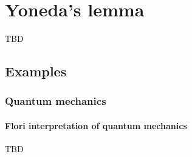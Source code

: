 \chapter{Yoneda's lemma}
\label{sec:yoneda}

TBD

\section{Examples}

\subsection{Quantum mechanics}

\subsubsection{Flori interpretation of quantum mechanics}
TBD
